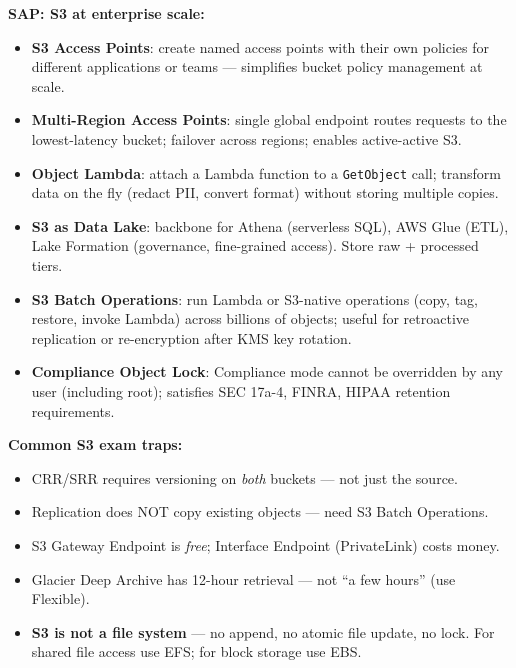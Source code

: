 \begin{sapdepth}
\textbf{SAP: S3 at enterprise scale:}
\begin{itemize}
  \item \textbf{S3 Access Points}: create named access points with their own policies for
        different applications or teams --- simplifies bucket policy management at scale.
  \item \textbf{Multi-Region Access Points}: single global endpoint routes requests to the
        lowest-latency bucket; failover across regions; enables active-active S3.
  \item \textbf{Object Lambda}: attach a Lambda function to a \texttt{GetObject} call;
        transform data on the fly (redact PII, convert format) without storing multiple copies.
  \item \textbf{S3 as Data Lake}: backbone for Athena (serverless SQL), AWS Glue (ETL),
        Lake Formation (governance, fine-grained access). Store raw + processed tiers.
  \item \textbf{S3 Batch Operations}: run Lambda or S3-native operations (copy, tag, restore,
        invoke Lambda) across billions of objects; useful for retroactive replication or
        re-encryption after KMS key rotation.
  \item \textbf{Compliance Object Lock}: Compliance mode cannot be overridden by any user
        (including root); satisfies SEC 17a-4, FINRA, HIPAA retention requirements.
\end{itemize}
\end{sapdepth}

\begin{examtip}
\textbf{Common S3 exam traps:}
\begin{itemize}
  \item CRR/SRR requires versioning on \emph{both} buckets --- not just the source.
  \item Replication does NOT copy existing objects --- need S3 Batch Operations.
  \item S3 Gateway Endpoint is \emph{free}; Interface Endpoint (PrivateLink) costs money.
  \item Glacier Deep Archive has 12-hour retrieval --- not ``a few hours'' (use Flexible).
  \item \textbf{S3 is not a file system} --- no append, no atomic file update, no lock.
        For shared file access use EFS; for block storage use EBS.
\end{itemize}
\end{examtip}
